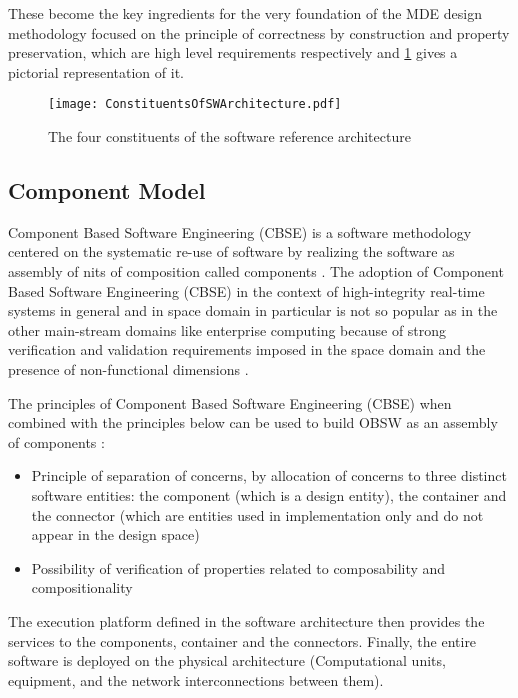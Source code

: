 These become the key ingredients for the very foundation of the MDE design methodology focused on the principle of correctness by construction and property preservation, which are high level requirements respectively and \cref{fig: Constituents of OSRA} gives a pictorial representation of it.

\begin{figure}[h]
	\centering
	\texttt{[image: ConstituentsOfSWArchitecture.pdf]}
	\caption{The four constituents of the software reference architecture}
	\label{fig: Constituents of OSRA}
\end{figure}

\subsection{Component Model}
Component Based Software Engineering (CBSE) is a software methodology centered on the systematic re-use of software by realizing the software as assembly of nits of composition called components \cite{CBSE}.
The adoption of Component Based Software Engineering (CBSE) in the context of high-integrity real-time systems in general and in space domain in particular is not so popular as in the other main-stream domains like enterprise computing \cite{SAVOIR} because of strong verification and validation requirements imposed in the space domain and the presence of non-functional dimensions \cite{SAVOIR}.

The principles of Component Based Software Engineering (CBSE) when combined with the principles below can be used to build OBSW as an assembly of components \cite{SAVOIR}: 
\begin{itemize}
\item Principle of separation of concerns, by allocation of concerns to three distinct software entities: the component (which is a design entity), the container and the connector (which are entities used in implementation only and do not appear in the design space)
\item Possibility of verification of properties related to composability and compositionality \cite{CompBasedDev} 
\end{itemize}

The execution platform defined in the software architecture then provides the services to the components, container and the connectors. Finally, the entire software is deployed on the physical architecture (Computational units, equipment, and the network interconnections between them).

